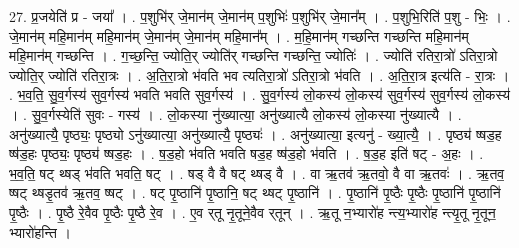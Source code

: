 \documentclass[17pt]{extarticle}
\begin{document}
27. प्र॒जयेति॑ प्र - जया᳚ । . प॒शुभि॑र् जे॒मान॑म् जे॒मान॑म् प॒शुभिः॑ प॒शुभि॑र् जे॒मान᳚म् । . प॒शुभि॒रिति॑ प॒शु - भिः॒ । . जे॒मान॑म् महि॒मान॑म् महि॒मान॑म् जे॒मान॑म् जे॒मान॑म् महि॒मान᳚म् । . म॒हि॒मान॑म् गच्छन्ति गच्छन्ति महि॒मान॑म् महि॒मान॑म् गच्छन्ति । . ग॒च्छ॒न्ति॒ ज्योति॒र् ज्योति॑र् गच्छन्ति गच्छन्ति॒ ज्योतिः॑ । . ज्योति॑ रतिरा॒त्रो॑ ऽतिरा॒त्रो ज्योति॒र् ज्योति॑ रतिरा॒त्रः । . अ॒ति॒रा॒त्रो भ॑वति भव त्यतिरा॒त्रो॑ ऽतिरा॒त्रो भ॑वति । . अ॒ति॒रा॒त्र इत्य॑ति - रा॒त्रः । . भ॒व॒ति॒ सु॒व॒र्गस्य॑ सुव॒र्गस्य॑ भवति भवति सुव॒र्गस्य॑ । . सु॒व॒र्गस्य॑ लो॒कस्य॑ लो॒कस्य॑ सुव॒र्गस्य॑ सुव॒र्गस्य॑ लो॒कस्य॑ । . सु॒व॒र्गस्येति॑ सुवः - गस्य॑ । . लो॒कस्या नु॑ख्यात्या॒ अनु॑ख्यात्यै लो॒कस्य॑ लो॒कस्या नु॑ख्यात्यै । . अनु॑ख्यात्यै॒ पृष्ठ्यः॒ पृष्ठ्यो ऽनु॑ख्यात्या॒ अनु॑ख्यात्यै॒ पृष्ठ्यः॑ । . अनु॑ख्यात्या॒ इत्यनु॑ - ख्या॒त्यै॒ । . पृष्ठ्य॑ ष्षड॒ह ष्ष॑ड॒हः पृष्ठ्यः॒ पृष्ठ्य॑ ष्षड॒हः । . ष॒ड॒हो भ॑वति भवति षड॒ह ष्ष॑ड॒हो भ॑वति । . ष॒ड॒ह इति॑ षट् - अ॒हः । . भ॒व॒ति॒ षट् थ्षड् भ॑वति भवति॒ षट् । . षड् वै वै षट् थ्षड् वै । . वा ऋ॒तव॑ ऋ॒तवो॒ वै वा ऋ॒तवः॑ । . ऋ॒तव॒ ष्षट् थ्षडृ॒तव॑ ऋ॒तव॒ ष्षट् । . षट् पृ॒ष्ठानि॑ पृ॒ष्ठानि॒ षट् थ्षट् पृ॒ष्ठानि॑ । . पृ॒ष्ठानि॑ पृ॒ष्ठैः पृ॒ष्ठैः पृ॒ष्ठानि॑ पृ॒ष्ठानि॑ पृ॒ष्ठैः । . पृ॒ष्ठै रे॒वैव पृ॒ष्ठैः पृ॒ष्ठै रे॒व । . ए॒व र्‌तू नृ॒तूने॒वैव र्‌तून् । . ऋ॒तू न॒भ्यारो॑ह न्त्य॒भ्यारो॑ह न्त्यृ॒तू नृ॒तून॒ भ्यारो॑हन्ति । \newline
\end{document}
